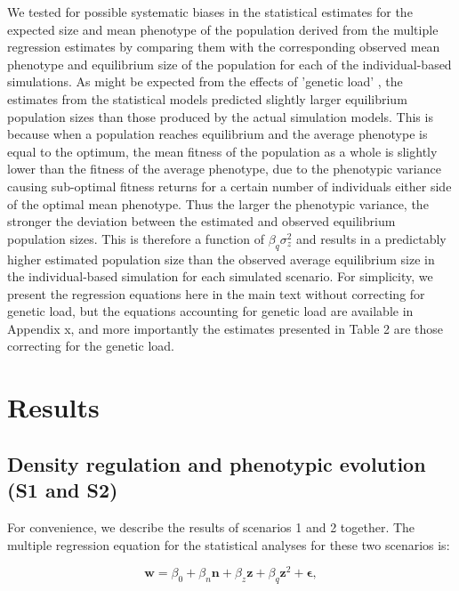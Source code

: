 \documentclass{article}
\begin{document}
We tested for possible systematic biases in the statistical estimates for the expected size and mean phenotype of the population derived from the multiple regression estimates by comparing them with the corresponding observed mean phenotype and equilibrium size of the population for each of the individual-based simulations. As might be expected from the effects of 'genetic load' \citep{Lande1996}, the estimates from the statistical models predicted slightly larger equilibrium population sizes than those produced by the actual simulation models. This is because when a population reaches equilibrium and the average phenotype is equal to the optimum, the mean fitness of the population as a whole is slightly lower than  the fitness of the average phenotype, due to the phenotypic variance causing sub-optimal fitness returns for a certain number of individuals either side of the optimal mean phenotype. Thus the larger the phenotypic variance, the stronger the deviation between the estimated and observed equilibrium population sizes. This is therefore a function of $\beta_q \sigma^2_z$ and results in a predictably higher estimated population size than the observed average equilibrium size in the individual-based simulation for each simulated scenario. For simplicity, we present the regression equations here in the main text without correcting for genetic load, but the equations accounting for genetic load are available in Appendix x, and more importantly the estimates presented in Table 2 are those correcting for the genetic load.   

\section{Results}

\subsection{Density regulation and phenotypic evolution (S1 and S2)}

For convenience, we describe the results of scenarios 1 and 2 together. The multiple regression equation for the statistical analyses for these two scenarios is:

\begin{equation} \label{eq:fitness1}
\mathbf{w}=\beta_{0} +\beta_{n} \mathbf{n} + \beta_{z} \mathbf{z} + \beta_{q} \mathbf{z}^2 + \mathbf{\epsilon},
\end{equation}
\end{document}

